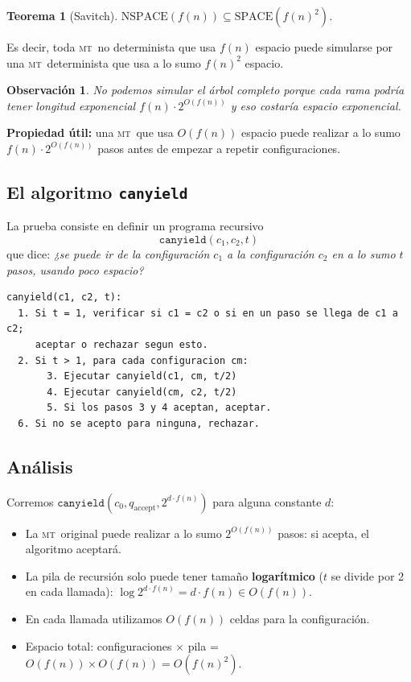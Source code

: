 \documentclass[11pt,a4paper]{article}
\theoremstyle{definicion}
\newtheorem{teorema}[definicion]{Teorema}
\newtheorem{observacion}[definicion]{Observaci\'on}
\newcommand{\MT}{\textsc{mt}}
\newcommand{\SPACE}{\mathrm{SPACE}}
\newcommand{\NSPACE}{\mathrm{NSPACE}}
\begin{document}
\begin{teorema}[Savitch]\label{teo:savitch}
$\NSPACE(f(n)) \subseteq \SPACE(f(n)^2)$.
\end{teorema}

Es decir, toda \MT\ no determinista que usa $f(n)$ espacio puede simularse por una \MT\ determinista que usa a lo sumo $f(n)^2$ espacio.

\begin{observacion}
No podemos simular el \'arbol completo porque cada rama podr\'ia tener longitud exponencial $f(n) \cdot 2^{O(f(n))}$ y eso costar\'ia espacio exponencial.
\end{observacion}

\textbf{Propiedad \'util:} una \MT\ que usa $O(f(n))$ espacio puede realizar a lo sumo $f(n) \cdot 2^{O(f(n))}$ pasos antes de empezar a repetir configuraciones.

\subsection{El algoritmo \texttt{canyield}}

La prueba consiste en definir un programa recursivo
\[
\texttt{canyield}(c_1, c_2, t)
\]
que dice: \emph{¿se puede ir de la configuraci\'on $c_1$ a la configuraci\'on $c_2$ en a lo sumo $t$ pasos, usando poco espacio?}

\begin{verbatim}
canyield(c1, c2, t):
  1. Si t = 1, verificar si c1 = c2 o si en un paso se llega de c1 a c2;
     aceptar o rechazar segun esto.
  2. Si t > 1, para cada configuracion cm:
       3. Ejecutar canyield(c1, cm, t/2)
       4. Ejecutar canyield(cm, c2, t/2)
       5. Si los pasos 3 y 4 aceptan, aceptar.
  6. Si no se acepto para ninguna, rechazar.
\end{verbatim}

\subsection{An\'alisis}

Corremos $\texttt{canyield}(c_0, q_{\text{accept}}, 2^{d \cdot f(n)})$ para alguna constante $d$:
\begin{itemize}
    \item La \MT\ original puede realizar a lo sumo $2^{O(f(n))}$ pasos: si acepta, el algoritmo aceptar\'a.
    \item La pila de recursi\'on solo puede tener tama\~no \textbf{logar\'itmico} ($t$ se divide por 2 en cada llamada): $\log 2^{d \cdot f(n)} = d \cdot f(n) \in O(f(n))$.
    \item En cada llamada utilizamos $O(f(n))$ celdas para la configuraci\'on.
    \item Espacio total: configuraciones $\times$ pila = $O(f(n)) \times O(f(n)) = O(f(n)^2)$.
\end{itemize}
\end{document}
